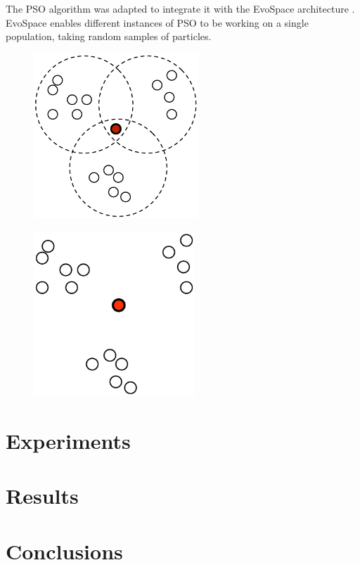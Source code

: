 \documentclass[runningheads,a4paper]{llncs}
\begin{document}
The PSO algorithm was adapted to integrate it with the EvoSpace
architecture \cite{garcia2015evospace}. EvoSpace enables different
instances of PSO to be working on a single population, taking random
samples of particles.

\begin{figure}
  \centering
  \includegraphics[height=6.2cm]{pdf/distributed-pso}
  \caption{}
  \label{distributed-pso}
\end{figure}

\begin{figure}
  \centering
  \includegraphics[height=6.2cm]{pdf/traditional-pso}
  \caption{}
  \label{traditional-pso}
\end{figure}

\section{Experiments}
\label{experiments}

\section{Results}
\label{results}

\section{Conclusions}
\label{conclusions}
\end{document}
